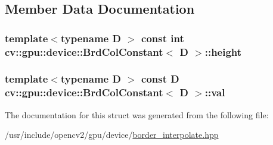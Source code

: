 \subsection{Member Data Documentation}
\hypertarget{structcv_1_1gpu_1_1device_1_1BrdColConstant_a6fc5fc1ed96b7f3a476e8b1802d5bdde}{
\subsubsection[{height}]{\setlength{\rightskip}{0pt plus 5cm}template$<$typename D $>$ const int {\bf cv\-::gpu\-::device\-::\-Brd\-Col\-Constant}$<$ D $>$\-::height}}\label{structcv_1_1gpu_1_1device_1_1BrdColConstant_a6fc5fc1ed96b7f3a476e8b1802d5bdde}
\hypertarget{structcv_1_1gpu_1_1device_1_1BrdColConstant_a8391967c0ef1f13709ad854a488ef840}{
\subsubsection[{val}]{\setlength{\rightskip}{0pt plus 5cm}template$<$typename D $>$ const D {\bf cv\-::gpu\-::device\-::\-Brd\-Col\-Constant}$<$ D $>$\-::val}}\label{structcv_1_1gpu_1_1device_1_1BrdColConstant_a8391967c0ef1f13709ad854a488ef840}


The documentation for this struct was generated from the following file\-:\begin{DoxyCompactItemize}
\item 
/usr/include/opencv2/gpu/device/\hyperlink{border__interpolate_8hpp}{border\-\_\-interpolate.\-hpp}\end{DoxyCompactItemize}
